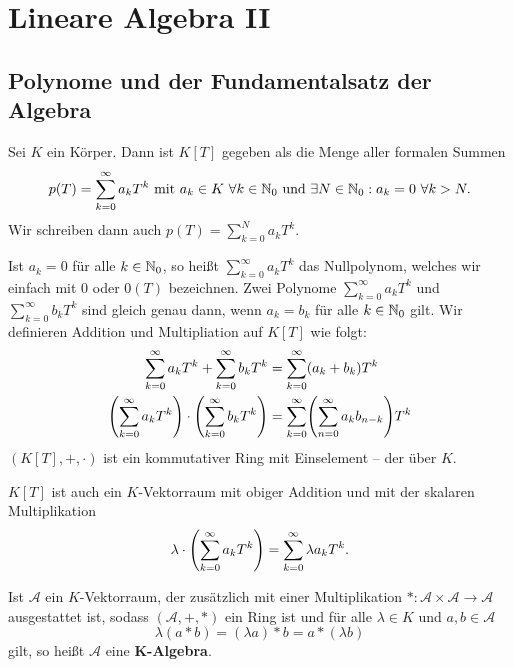 \chapter{Lineare Algebra II} %
\label{cha:2}
\setcounter{section}{0}
\section{Polynome und der Fundamentalsatz der Algebra}
\label{sec:2.1}

\begin{erinnerung}[Polynomring]
	\label{erinnerung:1.1}
	Sei $K$ ein Körper.
	Dann ist $K[T]$ gegeben als die Menge aller formalen Summen
	\[
		p(T) = \sum_{k=0}^{\infty} a_k T^k \text{ mit } a_k \in K \ \forall k \in \mathbb{N}_0 \text{ und } \exists N \in \mathbb{N}_0 : a_k = 0 \ \forall k > N.
	\]
	Wir schreiben dann auch $p(T) = \sum_{k=0}^{N} a_kT^k$.
	
	Ist $a_k=0$ für alle $k \in \mathbb{N}_0$, so heißt $\sum_{k=0}^{\infty} a_kT^k$ das Nullpolynom, welches wir einfach mit $0$ oder $0(T)$ bezeichnen.
	Zwei Polynome $\sum_{k=0}^{\infty} a_kT^k$ und $\sum_{k=0}^{\infty} b_kT^k$ sind gleich genau dann, wenn $a_k = b_k$ für alle $k \in \mathbb{N}_0$ gilt.
	Wir definieren Addition und Multipliation auf $K[T]$ wie folgt:
	\begin{align*}
		\sum_{k=0}^{\infty} a_kT^{k} + \sum_{k=0}^{\infty} b_kT^{k} &= \sum_{k=0}^{\infty} (a_k+b_k)T^{k} \\
		\enb{\sum_{k=0}^{\infty} a_kT^{k}} \cdot \enb{\sum_{k=0}^{\infty} b_kT^{k}} &= \sum_{k=0}^{\infty} \enb{\sum_{n=0}^{\infty} a_kb_{n-k}} T^{k}
	\end{align*}
	$(K[T],+,\cdot)$ ist ein kommutativer Ring mit Einselement -- der  über $K$.
	
	$K[T]$ ist auch ein $K$-Vektorraum mit obiger Addition und mit der skalaren Multiplikation
	\[
		\lambda \cdot \left(\sum_{k=0}^{\infty} a_kT^{k}\right) = \sum_{k=0}^{\infty} \lambda a_kT^{k}.
	\]
\end{erinnerung}

\begin{bemerkung}
	\label{bem:1.2}
	Ist $\mathcal{A}$ ein $K$-Vektorraum, der zusätzlich mit einer Multiplikation $*\colon \mathcal{A} \times \mathcal{A} \rightarrow \mathcal{A}$ ausgestattet ist, sodass $(\mathcal{A},+,*)$ ein Ring ist und für alle $\lambda \in K$ und $a,b\in \mathcal{A}$
	\[
		\lambda(a*b) = (\lambda a)*b = a * (\lambda b)
	\]
	gilt, so heißt $\mathcal{A}$ eine $\mathbf{K}$\textbf{-Algebra}. 
\end{bemerkung}

